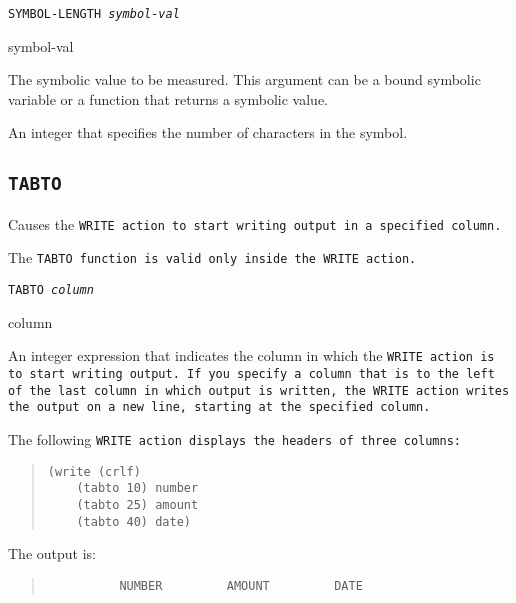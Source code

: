 {{\Format

\tt{SYMBOL-LENGTH} \it{symbol-val}

\begin{arguments}
\item[symbol-val]

  The symbolic value to be measured. This argument can be a bound
  symbolic variable or a function that returns a symbolic value.
\end{arguments}

\ReturnValue

An integer that specifies the number of characters in the symbol.

\subsection{\tt{TABTO}}

Causes the \tt{WRITE} action to start writing output in a specified
column.

\begin{note}
  The \tt{TABTO} function is valid only inside the \tt{WRITE} action.
\end{note}

\Format

\tt{TABTO} \it{column}

\begin{arguments}
\item[column]

  An integer expression that indicates the column in which the
  \tt{WRITE} action is to start writing output. If you specify a
  column that is to the left of the last column in which output is
  written, the \tt{WRITE} action writes the output on a new line,
  starting at the specified column.
\end{arguments}

\Example

The following \tt{WRITE} action displays the headers of three
columns:
\begin{quote}
\begin{verbatim}
(write (crlf) 
    (tabto 10) number
    (tabto 25) amount
    (tabto 40) date)
\end{verbatim}
\end{quote}
     
The output is:
\begin{quote}
\begin{verbatim}
          NUMBER         AMOUNT         DATE
\end{verbatim}
\end{quote}

}}
